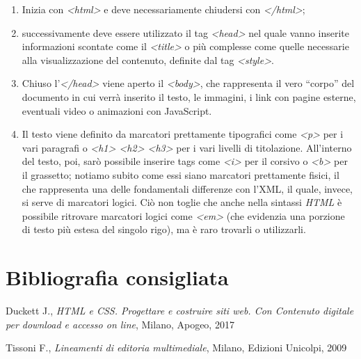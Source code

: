 \documentclass[
  b5paper,
  twoside,
  11pt,
  chapterprefix=false,
  bibliography=totocnumbered,
  parskip=0]{scrbook}
\begin{document}
\begin{enumerate}
\def\labelenumi{\arabic{enumi}.}
\item
  Inizia con \emph{\textless html\textgreater{}} e deve necessariamente chiudersi con
  \emph{\textless/html\textgreater{}};
\item
  successivamente deve essere utilizzato il tag \emph{\textless head\textgreater{}} nel quale
  vanno inserite informazioni scontate come il \emph{\textless title\textgreater{}} o più
  complesse come quelle necessarie alla visualizzazione del contenuto,
  definite dal tag \emph{\textless style\textgreater{}}.
\item
  Chiuso l'\emph{\textless/head\textgreater{}} viene aperto il \emph{\textless body\textgreater{}}, che rappresenta il
  vero \enquote{corpo} del documento in cui verrà inserito il testo, le
  immagini, i link con pagine esterne, eventuali video o animazioni
  con JavaScript.
\item
  Il testo viene definito da marcatori prettamente tipografici come
  \emph{\textless p\textgreater{}} per i vari paragrafi o \emph{\textless h1\textgreater{} \textless h2\textgreater{} \textless h3\textgreater{}} per i vari
  livelli di titolazione. All'interno del testo, poi, sarò possibile
  inserire tags come \emph{\textless i\textgreater{}} per il corsivo o \emph{\textless b\textgreater{}} per il
  grassetto; notiamo subito come essi siano marcatori prettamente
  fisici, il che rappresenta una delle fondamentali differenze con
  l'XML, il quale, invece, si serve di marcatori logici. Ciò non
  toglie che anche nella sintassi \emph{HTML} è possibile ritrovare
  marcatori logici come \emph{\textless em\textgreater{}} (che evidenzia una porzione di testo
  più estesa del singolo rigo), ma è raro trovarli o utilizzarli.
\end{enumerate}

\hypertarget{bibliografia-consigliata-12}{%
\section*{Bibliografia consigliata}\label{bibliografia-consigliata-12}}

Duckett J., \emph{HTML e CSS. Progettare e costruire siti web. Con Contenuto
digitale per download e accesso on line}, Milano, Apogeo, 2017

Tissoni F., \emph{Lineamenti di editoria multimediale}, Milano, Edizioni
Unicolpi, 2009
\end{document}
